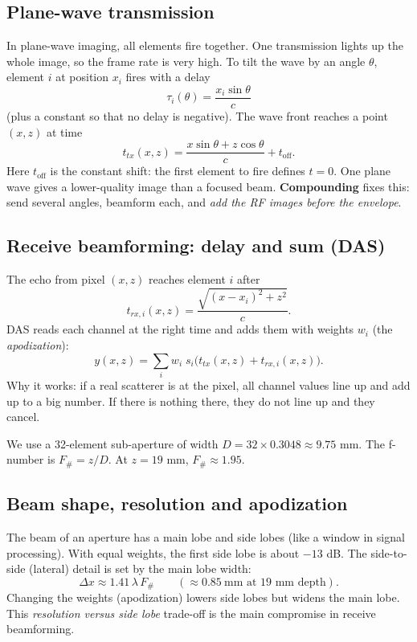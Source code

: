\documentclass[11pt,a4paper]{article}
\begin{document}
\subsection{Plane-wave transmission}
In plane-wave imaging, all elements fire together. One transmission lights up the whole image, so the frame rate is very high. To tilt the wave by an angle $\theta$, element $i$ at position $x_i$ fires with a delay
\begin{equation}
\tau_i(\theta) = \frac{x_i\sin\theta}{c}
\end{equation}
(plus a constant so that no delay is negative). The wave front reaches a point $(x,z)$ at time
\begin{equation}
t_{tx}(x,z) = \frac{x\sin\theta + z\cos\theta}{c} + t_{\text{off}}.
\end{equation}
Here $t_{\text{off}}$ is the constant shift: the first element to fire defines $t=0$. One plane wave gives a lower-quality image than a focused beam. \textbf{Compounding} fixes this: send several angles, beamform each, and \emph{add the RF images before the envelope}.

\subsection{Receive beamforming: delay and sum (DAS)}
The echo from pixel $(x,z)$ reaches element $i$ after
\begin{equation}
t_{rx,i}(x,z) = \frac{\sqrt{(x-x_i)^2 + z^2}}{c}.
\end{equation}
DAS reads each channel at the right time and adds them with weights $w_i$ (the \emph{apodization}):
\begin{equation}
y(x,z) = \sum_{i} w_i\; s_i\!\big(t_{tx}(x,z) + t_{rx,i}(x,z)\big).
\end{equation}
Why it works: if a real scatterer is at the pixel, all channel values line up and add up to a big number. If there is nothing there, they do not line up and they cancel.

We use a 32-element sub-aperture of width $D = 32\times0.3048 \approx 9.75$ mm. The f-number is $F_\# = z/D$. At $z = 19$ mm, $F_\# \approx 1.95$.

\subsection{Beam shape, resolution and apodization}
The beam of an aperture has a main lobe and side lobes (like a window in signal processing). With equal weights, the first side lobe is about $-13$ dB. The side-to-side (lateral) detail is set by the main lobe width:
\begin{equation}
\Delta x \approx 1.41\,\lambda\,F_\# \qquad(\approx 0.85\ \text{mm at 19 mm depth}).
\end{equation}
Changing the weights (apodization) lowers side lobes but widens the main lobe. This \emph{resolution versus side lobe} trade-off is the main compromise in receive beamforming.
\end{document}
